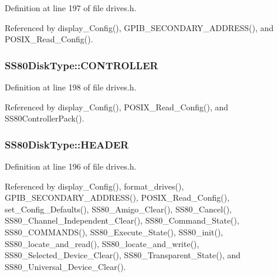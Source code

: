 Definition at line 197 of file drives.\+h.



Referenced by display\+\_\+\+Config(), G\+P\+I\+B\+\_\+\+S\+E\+C\+O\+N\+D\+A\+R\+Y\+\_\+\+A\+D\+D\+R\+E\+S\+S(), and P\+O\+S\+I\+X\+\_\+\+Read\+\_\+\+Config().

\subsubsection[{\texorpdfstring{C\+O\+N\+T\+R\+O\+L\+L\+ER}{CONTROLLER}}]{ S\+S80\+Disk\+Type\+::\+C\+O\+N\+T\+R\+O\+L\+L\+ER}\hypertarget{structSS80DiskType_ae9da84cba5786cf755c388eba065c0cd}{}\label{structSS80DiskType_ae9da84cba5786cf755c388eba065c0cd}


Definition at line 198 of file drives.\+h.



Referenced by display\+\_\+\+Config(), P\+O\+S\+I\+X\+\_\+\+Read\+\_\+\+Config(), and S\+S80\+Controller\+Pack().

\subsubsection[{\texorpdfstring{H\+E\+A\+D\+ER}{HEADER}}]{ S\+S80\+Disk\+Type\+::\+H\+E\+A\+D\+ER}\hypertarget{structSS80DiskType_ae66c0130dee8c362743dfdfc41539c3b}{}\label{structSS80DiskType_ae66c0130dee8c362743dfdfc41539c3b}


Definition at line 196 of file drives.\+h.



Referenced by display\+\_\+\+Config(), format\+\_\+drives(), G\+P\+I\+B\+\_\+\+S\+E\+C\+O\+N\+D\+A\+R\+Y\+\_\+\+A\+D\+D\+R\+E\+S\+S(), P\+O\+S\+I\+X\+\_\+\+Read\+\_\+\+Config(), set\+\_\+\+Config\+\_\+\+Defaults(), S\+S80\+\_\+\+Amigo\+\_\+\+Clear(), S\+S80\+\_\+\+Cancel(), S\+S80\+\_\+\+Channel\+\_\+\+Independent\+\_\+\+Clear(), S\+S80\+\_\+\+Command\+\_\+\+State(), S\+S80\+\_\+\+C\+O\+M\+M\+A\+N\+D\+S(), S\+S80\+\_\+\+Execute\+\_\+\+State(), S\+S80\+\_\+init(), S\+S80\+\_\+locate\+\_\+and\+\_\+read(), S\+S80\+\_\+locate\+\_\+and\+\_\+write(), S\+S80\+\_\+\+Selected\+\_\+\+Device\+\_\+\+Clear(), S\+S80\+\_\+\+Transparent\+\_\+\+State(), and S\+S80\+\_\+\+Universal\+\_\+\+Device\+\_\+\+Clear().

